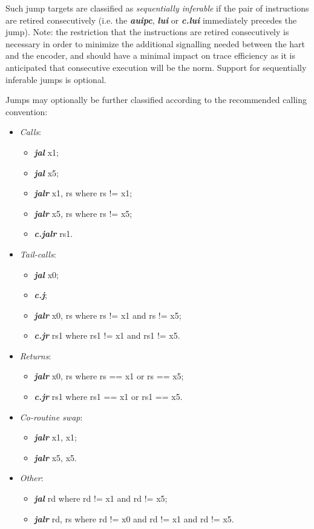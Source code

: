 Such jump targets are classified as \textit{sequentially inferable} if the pair of instructions are retired consecutively 
(i.e. the \textbf{\textit{auipc}}, \textbf{\textit{lui}} or \textbf{\textit{c.lui}} immediately precedes the jump).  Note:
the restriction that the instructions are retired consecutively is necessary in order to minimize the additional signalling
needed between the hart and the encoder, and should have a minimal impact on trace efficiency as it is anticipated that
consecutive execution will be the norm. Support for sequentially inferable jumps is optional.

Jumps may optionally be further classified according to the recommended calling convention:

\begin{itemize}
  \item \textit{Calls}: 
    \begin{itemize}
      \item \textbf{\textit{jal}} x1;
      \item \textbf{\textit{jal}} x5;
      \item \textbf{\textit{jalr}} x1, rs  where rs != x1;
      \item \textbf{\textit{jalr}} x5, rs  where rs != x5;
      \item \textbf{\textit{c.jalr}} rs1.
    \end{itemize}
  \item \textit{Tail-calls}: 
    \begin{itemize}
      \item \textbf{\textit{jal}} x0;
      \item \textbf{\textit{c.j}};
      \item \textbf{\textit{jalr}} x0, rs where rs != x1 and rs != x5;
      \item \textbf{\textit{c.jr}} rs1 where rs1 != x1 and rs1 != x5.
    \end{itemize}
  \item \textit{Returns}: 
    \begin{itemize}
      \item \textbf{\textit{jalr}} x0, rs where rs == x1 or rs == x5;
      \item \textbf{\textit{c.jr}} rs1 where rs1 == x1 or rs1 == x5.
    \end{itemize}
  \item \textit{Co-routine swap}: 
    \begin{itemize}
      \item \textbf{\textit{jalr}} x1, x1;
      \item \textbf{\textit{jalr}} x5, x5.
    \end{itemize}
  \item \textit{Other}: 
    \begin{itemize}
      \item \textbf{\textit{jal}} rd where rd != x1 and rd != x5;
      \item \textbf{\textit{jalr}} rd, rs where rd != x0 and rd != x1 and rd != x5.
    \end{itemize}
\end{itemize}

